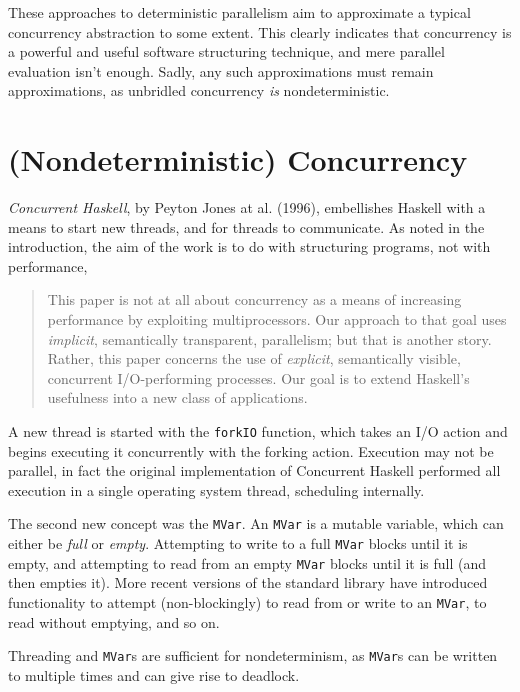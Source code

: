 These approaches to deterministic parallelism aim to approximate a
typical concurrency abstraction to some extent. This clearly indicates
that concurrency is a powerful and useful software structuring
technique, and mere parallel evaluation isn't enough. Sadly, any such
approximations must remain approximations, as unbridled concurrency
\textit{is} nondeterministic.

\section{(Nondeterministic) Concurrency}
\label{sec:litrev-conc}

\textit{Concurrent Haskell}, by Peyton Jones at
al. (1996)\nocite{concurrent}, embellishes Haskell with a means to
start new threads, and for threads to communicate. As noted in the
introduction, the aim of the work is to do with structuring programs,
not with performance,

\begin{quote}
  This paper is not at all about concurrency as a means of increasing
  performance by exploiting multiprocessors. Our approach to that goal
  uses \textit{implicit}, semantically transparent, parallelism; but
  that is another story. Rather, this paper concerns the use of
  \textit{explicit}, semantically visible, concurrent I/O-performing
  processes. Our goal is to extend Haskell's usefulness into a new
  class of applications.\cite{concurrent}
\end{quote}

A new thread is started with the \verb|forkIO| function, which takes
an I/O action and begins executing it concurrently with the forking
action. Execution may not be parallel, in fact the original
implementation of Concurrent Haskell performed all execution in a
single operating system thread, scheduling internally.

The second new concept was the \verb|MVar|. An \verb|MVar| is a
mutable variable, which can either be \textit{full} or
\textit{empty}. Attempting to write to a full \verb|MVar| blocks until
it is empty, and attempting to read from an empty \verb|MVar| blocks
until it is full (and then empties it). More recent versions of the
standard library have introduced functionality to attempt
(non-blockingly) to read from or write to an \verb|MVar|, to read
without emptying, and so on.

Threading and \verb|MVar|s are sufficient for nondeterminism, as
\verb|MVar|s can be written to multiple times and can give rise to
deadlock.

